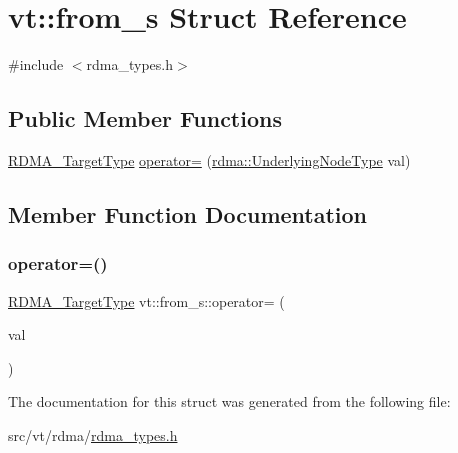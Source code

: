 \hypertarget{structvt_1_1from__s}{}\section{vt\+:\+:from\+\_\+s Struct Reference}
\label{structvt_1_1from__s}


{\ttfamily \#include $<$rdma\+\_\+types.\+h$>$}

\subsection*{Public Member Functions}
\begin{DoxyCompactItemize}
\item 
\hyperlink{namespacevt_a9bf03a57102d0274cc229b9ef94bb59e}{R\+D\+M\+A\+\_\+\+Target\+Type} \hyperlink{structvt_1_1from__s_a62dbe2de72bf400718e6146c4a9f4ef8}{operator=} (\hyperlink{namespacevt_1_1rdma_a20d01bc82b95453c162d4b9857a4a78a}{rdma\+::\+Underlying\+Node\+Type} val)
\end{DoxyCompactItemize}


\subsection{Member Function Documentation}
\mbox{\label{structvt_1_1from__s_a62dbe2de72bf400718e6146c4a9f4ef8}} 
\subsubsection{\texorpdfstring{operator=()}{operator=()}}
{\footnotesize\ttfamily \hyperlink{namespacevt_a9bf03a57102d0274cc229b9ef94bb59e}{R\+D\+M\+A\+\_\+\+Target\+Type} vt\+::from\+\_\+s\+::operator= (\begin{DoxyParamCaption}\item[{\hyperlink{namespacevt_1_1rdma_a20d01bc82b95453c162d4b9857a4a78a}{rdma\+::\+Underlying\+Node\+Type}}]{val }\end{DoxyParamCaption})\hspace{0.3cm}{\ttfamily [inline]}}



The documentation for this struct was generated from the following file\+:\begin{DoxyCompactItemize}
\item 
src/vt/rdma/\hyperlink{rdma__types_8h}{rdma\+\_\+types.\+h}\end{DoxyCompactItemize}
